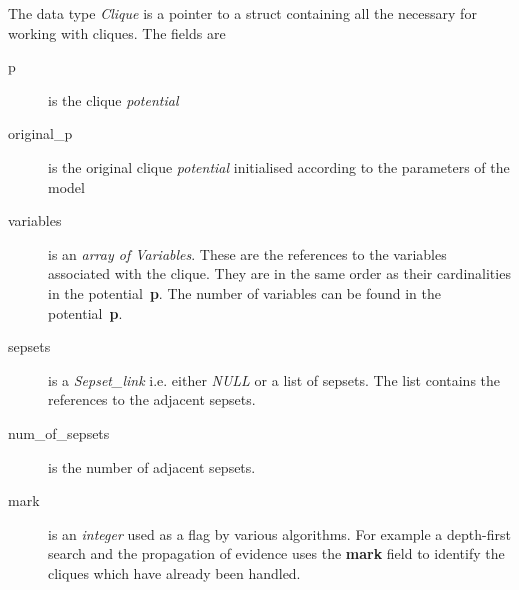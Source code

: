 \documentclass[12pt,a4paper]{report}
\begin{document}
The data type {\it Clique} is a pointer to a struct containing all the
necessary for working with cliques. The fields are
\begin{description}
\item[p] is the clique {\it potential}
\item[original\_p] is the original clique {\it potential} initialised
according to the parameters of the model
\item[variables] is an {\it array of Variables}. These are the
references to the variables associated with the clique. They are in
the same order as their cardinalities in the potential~\textbf{p}.
The number of variables can be found in the potential~\textbf{p}.
\item[sepsets] is a {\it Sepset\_link} i.e. either {\it NULL} or a
list of sepsets. The list contains the references to the adjacent sepsets.
\item[num\_of\_sepsets] is the number of adjacent sepsets.
\item[mark] is an {\it integer} used as a flag by various algorithms. For
example a depth-first search and the propagation of evidence uses the 
\textbf{mark} field to identify the cliques which have already been 
handled.

\end{description}
\end{document}
